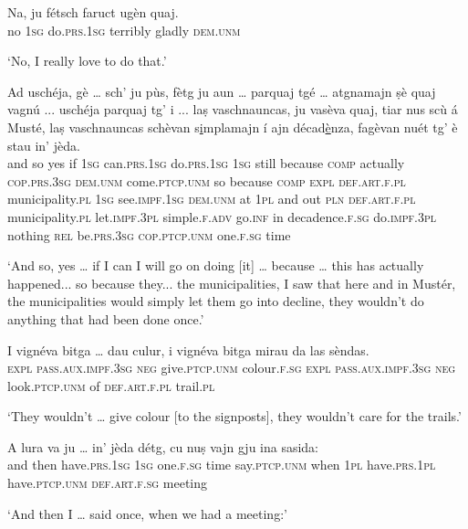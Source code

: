 \begin{linenumbers}
\gll Na, ju fétsch faruct ugèn quaj.   \\
no \textsc{1sg} do.\textsc{prs.1sg} terribly gladly \textsc{dem.unm} \\
\end{linenumbers}
\medskip
\glt `No, I really love to do that.'
\medskip

\begin{linenumbers}
\gll  Ad uschéja, gè … sch’ ju pùs, fètg ju aun … parquaj tgé … atgnamajn ṣè quaj vagnú ... uschéja parquaj tg' i ... laṣ vaschnauncas, ju vasèva quaj, tiar nus scù á Musté, laṣ vaschnauncas schèvan s\underline{i}mplamajn í ajn décad\underline{è}nza, fagèvan nuét tg’ è stau in’ jèda.  \\
and so yes {} if \textsc{1sg} can.\textsc{prs.1sg} do.\textsc{prs.1sg} \textsc{1sg} still {} because \textsc{comp} {} actually \textsc{cop.prs.3sg} \textsc{dem.unm}  come.\textsc{ptcp.unm} {} so because \textsc{comp} \textsc{expl} {} \textsc{def.art.f.pl} municipality.\textsc{pl} \textsc{1sg} see.\textsc{impf.1sg} \textsc{dem.unm} at \textsc{1pl} and out \textsc{pln} \textsc{def.art.f.pl} municipality.\textsc{pl} let.\textsc{impf.3pl} simple.\textsc{f.adv}  go.\textsc{inf} in decadence.\textsc{f.sg} do.\textsc{impf.3pl} nothing \textsc{rel} be.\textsc{prs.3sg} \textsc{cop.ptcp.unm} one.\textsc{f.sg} time\\
\end{linenumbers}
\medskip
\glt `And so, yes … if I can I will go on doing [it] … because … this has actually happened... so because they... the municipalities, I saw that here and in Mustér, the municipalities would simply let them go into decline, they wouldn’t do anything that had been done once.'
\medskip

\begin{linenumbers}
\gll I vignéva bitga … dau culur, i vignéva bitga mirau da las sèndas.   \\
 \textsc{expl} \textsc{pass.aux.impf.3sg} \textsc{neg} {} give.\textsc{ptcp.unm}  colour.\textsc{f.sg} \textsc{expl} \textsc{pass.aux.impf.3sg} \textsc{neg}  look.\textsc{ptcp.unm} of  \textsc{def.art.f.pl} trail.\textsc{pl}\\
\end{linenumbers}
\medskip
\glt `They wouldn’t … give colour [to the signposts], they wouldn’t care for the trails.'\medskip

\begin{linenumbers}
\gll  A lura va ju … in’ jèda détg, cu nuṣ vajn gju ina sasida:  \\
and then have.\textsc{prs.1sg} \textsc{1sg} {} one.\textsc{f.sg} time say.\textsc{ptcp.unm} when \textsc{1pl} have.\textsc{prs.1pl} have.\textsc{ptcp.unm} \textsc{def.art.f.sg} meeting  \\
\end{linenumbers}
\medskip
\glt `And then I … said once, when we had a meeting:'
\medskip

